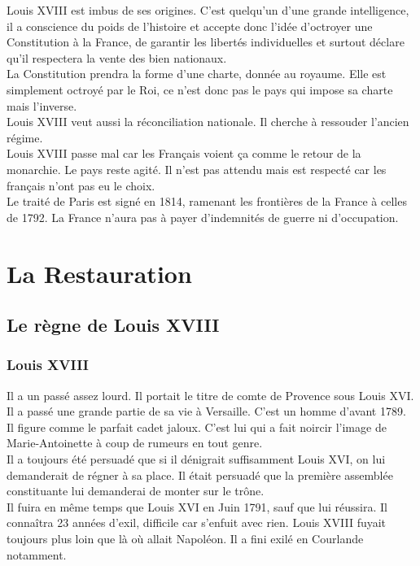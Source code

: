 \documentclass[10pt, a4paper, openany]{book}
\begin{document}
Louis XVIII est imbus de ses origines. C'est quelqu'un d'une grande intelligence, il a conscience du poids de l'histoire et accepte donc l'idée d'octroyer une Constitution à la France, de garantir les libertés individuelles et surtout déclare qu'il respectera la vente des bien nationaux. \\
La Constitution prendra la forme d'une charte, donnée au royaume. Elle est simplement octroyé par le Roi, ce n'est donc pas le pays qui impose sa charte mais l'inverse. \\
Louis XVIII veut aussi la réconciliation nationale. Il cherche à ressouder l'ancien régime. \\
Louis XVIII passe mal car les Français voient ça comme le retour de la monarchie. Le pays reste agité. Il n'est pas attendu mais est respecté car les français n'ont pas eu le choix. \\
Le traité de Paris est signé en 1814, ramenant les frontières de la France à celles de 1792. La France n'aura pas à payer d'indemnités de guerre ni d'occupation. 

\section{La Restauration}

\subsection{Le règne de Louis XVIII}

\subsubsection{Louis XVIII}

Il a un passé assez lourd. Il portait le titre de comte de Provence sous Louis XVI. Il a passé une grande partie de sa vie à Versaille. C'est un homme d'avant 1789. Il figure comme le parfait cadet jaloux. C'est lui qui a fait noircir l'image de Marie-Antoinette à coup de rumeurs en tout genre. \\
Il a toujours été persuadé que si il dénigrait suffisamment Louis XVI, on lui demanderait de régner à sa place. Il était persuadé que la première assemblée constituante lui demanderai de monter sur le trône. \\
Il fuira en même temps que Louis XVI en Juin 1791, sauf que lui réussira. Il connaîtra 23 années d'exil, difficile car s'enfuit avec rien. Louis XVIII fuyait toujours plus loin que là où allait Napoléon. Il a fini exilé en Courlande notamment. 
\end{document}
